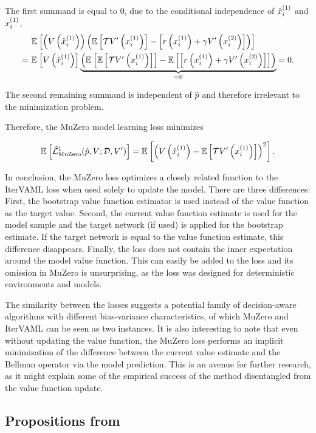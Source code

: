 The first summand is equal to $0$, due to the conditional independence of $\hat{x}^{(1)}_i$ and $x^{(1)}_i$,
\begin{align*}
    &~\mathbb{E}_{}\left[  \left( V\left( \hat{x}^{(1)}_i \right) \right)\left( \mathbb{E}\left[ \mathcal{T}V'\left( x^{(1)}_i \right) \right] - \left[ r\left( x^{(1)}_i \right) + \gamma V'\left( x^{(2)}_{i} \right)  \right] \right) \right]\\
    =&~\mathbb{E}_{}\left[  V\left( \hat{x}^{(1)}_i \right) \right] \underbrace{\left( \mathbb{E}_{}\left[  \mathbb{E}\left[ \mathcal{T}V'\left( x^{(1)}_i \right) \right] \right] - \mathbb{E}_{}\left[  \left[ r\left( x^{(1)}_i \right) + \gamma V'\left( x^{(2)}_{i} \right)  \right] \right] \right)}_{= 0} = 0.
\end{align*}

The second remaining summand is independent of $\hat{p}$ and therefore irrelevant to the minimization problem.

Therefore, the MuZero model learning loss minimizes

\begin{align*}
    \mathbb{E}_{}\left[  \hat{\mathcal{L}}^1_\text{MuZero}(\hat{p}, V; \mathcal{D}, V') \right] = \mathbb{E}_{}\left[   \left( V\left( \hat{x}^{(1)}_i \right) - \mathbb{E}\left[ \mathcal{T}V'\left( x^{(1)}_i \right) \right] \right)^2 \right].
\end{align*}

In conclusion, the MuZero loss optimizes a closely related function to the IterVAML loss when used solely to update the model.
There are three differences:
First, the bootstrap value function estimator is used instead of the value function as the target value.
Second, the current value function estimate is used for the model sample and the target network (if used) is applied for the bootstrap estimate. If the target network is equal to the value function estimate, this difference disappears.
Finally, the loss does not contain the inner expectation around the model value function.
This can easily be added to the loss and its omission in MuZero is unsurprising, as the loss was designed for deterministic environments and models.

The similarity between the losses suggests a potential family of decision-aware algorithms with different bias-variance characteristics, of which MuZero and IterVAML can be seen as two instances.
It is also interesting to note that even without updating the value function, the MuZero loss performs an implicit minimization of the difference between the current value estimate and the Bellman operator via the model prediction.
This is an avenue for further research, as it might explain some of the empirical success of the method disentangled from the value function update.

\subsection{Propositions from \cite{bertsekasshreve1978}}
\label{sec:bertsekas}

